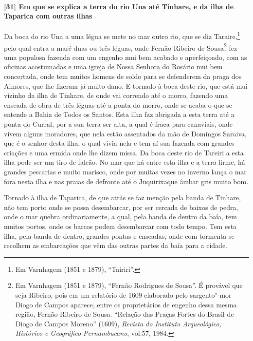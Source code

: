 \paragraph{[31] Em que se explica a terra do rio Una até Tinhare, e da ilha de Taparica com
outras ilhas}\quad
Da boca do rio Una a uma légua se mete no mar outro rio, que se diz Taraire,\footnote{ Em
Varnhagem (1851 e 1879), ``Tairiri''.} pelo qual entra a maré duas ou três léguas, onde
Fernão Ribeiro de Sousa\footnote{ Em Varnhagem (1851 e 1879), ``Fernão Rodrigues de
Sousa''. É provável que seja Ribeiro, pois em um relatório de 1609 elaborado pelo
sargento"-mor Diogo de Campos aparece, entre os proprietários de engenho dessa mesma
região, Fernão Ribeiro de Sousa. “Relação das Praças Fortes do Brasil de Diogo de Campos
Moreno” (1609), \textit{Revista do Instituto Arqueológico, Histórico e Geográfico
Pernambucano}, vol.57, 1984.} fez uma populosa fazenda com um engenho mui bem acabado e
aperfeiçoado, com as oficinas acostumadas e uma igreja de Nossa Senhora do Rosário mui bem
concertada, onde tem muitos homens de soldo para se defenderem da praga dos Aimores, que
lhe fizeram já muito dano. E tornado à boca deste rio, que
está mui vizinho da ilha de Tinhare, de onde vai correndo até o morro, fazendo uma enseada
de obra de três léguas até a ponta do morro, onde se acaba o que se entende a Bahia de
Todos os Santos. Esta ilha faz abrigada a esta terra até a ponta do Curral, por a sua
terra ser alta, a qual é fraca para canaviais, onde vivem alguns moradores, que nela estão
assentados da mão de Domingos Saraiva, que é o senhor desta ilha, o qual vivia nela e tem
aí sua fazenda com grandes criações e uma ermida onde lhe dizem missa. Da boca deste rio
de Tareiri a esta ilha pode ser um tiro de falcão. No mar que há entre esta ilha e a terra
firme, há grandes pescarias e muito marisco, onde por muitas vezes no inverno lança o mar
fora nesta ilha e nas praias de defronte até o Juquirixaque âmbar gris muito bom.

Tornado à ilha de Taparica, de que atrás se faz menção pela banda de Tinhare, não tem
porto onde se possa desembarcar, por ser cercada de baixos de pedra, onde o mar quebra
ordinariamente, a qual, pela banda de dentro da baía, tem muitos portos, onde os barcos
podem desembarcar com todo tempo. Tem esta ilha, pela banda de dentro, grandes pontas e
enseadas, onde com tormenta se recolhem as embarcações que vêm das outras partes da baía
para a cidade.

